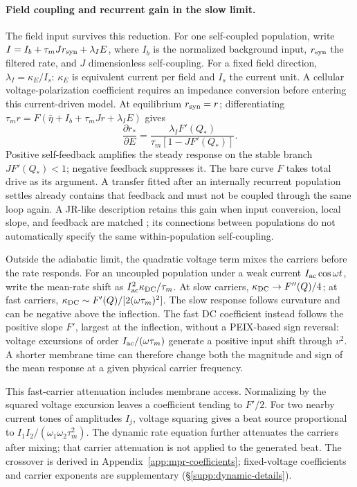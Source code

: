 \paragraph{Field coupling and recurrent gain in the slow limit.}
The field input survives this reduction. For one self-coupled population,
write $I=I_b+\tau_mJr_{\rm syn}+\lambda_I E$, where $I_b$ is the normalized
background input, $r_{\rm syn}$ the filtered rate, and $J$ dimensionless
self-coupling. For a fixed field direction, $\lambda_I=\kappa_E/I_s$:
$\kappa_E$ is equivalent current per field and $I_s$ the current unit.
A cellular voltage-polarization coefficient requires an impedance conversion
before entering this current-driven model. At equilibrium $r_{\rm syn}=r$;
differentiating $\tau_mr=F(\bar\eta+I_b+\tau_mJr+\lambda_IE)$ gives
\begin{equation}
\frac{\partial r_*}{\partial E}
=\frac{\lambda_I F'(Q_*)}{\tau_m[1-JF'(Q_*)]}.
\label{eq:slow-field-gain}
\end{equation}
Positive self-feedback amplifies the steady response on the stable branch
$JF'(Q_*)<1$; negative feedback suppresses it. The bare curve $F$ takes
total drive as its argument. A transfer fitted after an internally recurrent
population settles already contains that feedback and must not be coupled
through the same loop again. A JR-like description retains this gain when
input conversion, local slope, and feedback are matched
\cite{ruffini2021nmm2,clusella2023}; its connections between populations do
not automatically specify the same within-population self-coupling.

Outside the adiabatic limit, the quadratic voltage term mixes the carriers
before the rate responds. For an uncoupled population under a weak current
$I_{\rm ac}\cos\omega t$, write the mean-rate shift as
$I_{\rm ac}^2\kappa_{\rm DC}/\tau_m$. At slow carriers,
$\kappa_{\rm DC}\to F''(Q)/4$; at fast carriers,
$\kappa_{\rm DC}\sim F'(Q)/[2(\omega\tau_m)^2]$.
The slow response follows curvature and can be negative above the inflection.
The fast DC coefficient instead follows the positive slope $F'$, largest at the
inflection, without a PEIX-based sign reversal: voltage excursions of order
$I_{\rm ac}/(\omega\tau_m)$ generate a positive input shift through $v^2$.
A shorter membrane time can therefore change both the magnitude and sign
of the mean response at a given physical carrier frequency.

This fast-carrier attenuation includes membrane access. Normalizing by the
squared voltage excursion leaves a coefficient tending to $F'/2$.
For two nearby current tones of amplitudes $I_j$, voltage squaring gives a
beat source proportional to $I_1I_2/(\omega_1\omega_2\tau_m^2)$.
The dynamic rate equation further attenuates the carriers after mixing;
that carrier attenuation is not applied to the generated beat. The crossover is derived in
Appendix~\ref{app:mpr-coefficients}; fixed-voltage coefficients and carrier
exponents are supplementary (\S\ref{supp:dynamic-details}).

